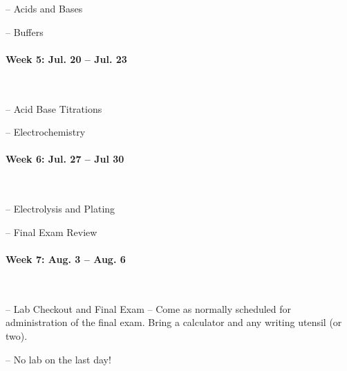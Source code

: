 \documentclass[12pt, letterpaper]{article}
\begin{document}
-- Acids and Bases

-- Buffers

\paragraph{Week 5: Jul. 20 -- Jul. 23}~

-- Acid Base Titrations

-- Electrochemistry

\paragraph{Week 6: Jul. 27 -- Jul 30}~

-- Electrolysis and Plating

-- Final Exam Review

\paragraph{Week 7: Aug. 3 -- Aug. 6}~

-- Lab Checkout and Final Exam -- Come as normally scheduled for administration of the final exam. Bring a calculator and any writing utensil (or two).

-- No lab on the last day!
\end{document}
